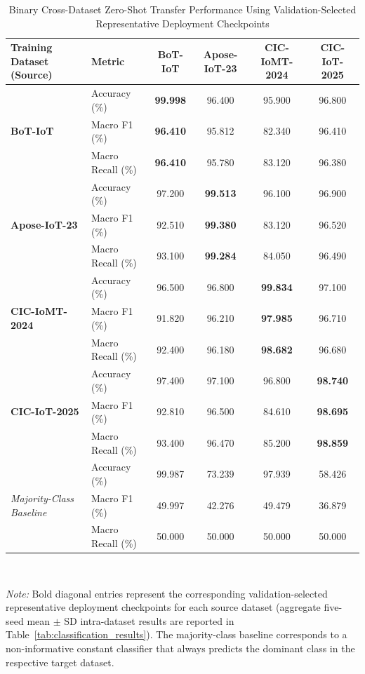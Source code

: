 \documentclass[a4paper,fleqn]{cas-sc}
\begin{document}
\begin{table}[h]
\centering
\caption{Binary Cross-Dataset Zero-Shot Transfer Performance Using Validation-Selected Representative Deployment Checkpoints}
\label{tab:cross_dataset}
\begin{tabular}{llcccc}
\toprule
\textbf{Training Dataset (Source)} & \textbf{Metric} & \textbf{BoT-IoT} & \textbf{Apose-IoT-23} & \textbf{CIC-IoMT-2024} & \textbf{CIC-IoT-2025} \\
\midrule
\multirow{3}{*}{\textbf{BoT-IoT}} & Accuracy (\%) & \textbf{99.998} & 96.400 & 95.900 & 96.800 \\
 & Macro F1 (\%) & \textbf{96.410} & 95.812 & 82.340 & 96.410 \\
 & Macro Recall (\%) & \textbf{96.410} & 95.780 & 83.120 & 96.380 \\
\cline{1-6}
\multirow{3}{*}{\textbf{Apose-IoT-23}} & Accuracy (\%) & 97.200 & \textbf{99.513} & 96.100 & 96.900 \\
 & Macro F1 (\%) & 92.510 & \textbf{99.380} & 83.120 & 96.520 \\
 & Macro Recall (\%) & 93.100 & \textbf{99.284} & 84.050 & 96.490 \\
\cline{1-6}
\multirow{3}{*}{\textbf{CIC-IoMT-2024}} & Accuracy (\%) & 96.500 & 96.800 & \textbf{99.834} & 97.100 \\
 & Macro F1 (\%) & 91.820 & 96.210 & \textbf{97.985} & 96.710 \\
 & Macro Recall (\%) & 92.400 & 96.180 & \textbf{98.682} & 96.680 \\
\cline{1-6}
\multirow{3}{*}{\textbf{CIC-IoT-2025}} & Accuracy (\%) & 97.400 & 97.100 & 96.800 & \textbf{98.740} \\
 & Macro F1 (\%) & 92.810 & 96.500 & 84.610 & \textbf{98.695} \\
 & Macro Recall (\%) & 93.400 & 96.470 & 85.200 & \textbf{98.859} \\
\midrule
\multirow{3}{*}{\textit{Majority-Class Baseline}} & Accuracy (\%) & 99.987 & 73.239 & 97.939 & 58.426 \\
 & Macro F1 (\%) & 49.997 & 42.276 & 49.479 & 36.879 \\
 & Macro Recall (\%) & 50.000 & 50.000 & 50.000 & 50.000 \\
\bottomrule
\end{tabular}
\\[1.5ex]
\parbox{\linewidth}{\footnotesize \textit{Note:} Bold diagonal entries represent the corresponding validation-selected representative deployment checkpoints for each source dataset (aggregate five-seed mean $\pm$ SD intra-dataset results are reported in Table~\ref{tab:classification_results}). The majority-class baseline corresponds to a non-informative constant classifier that always predicts the dominant class in the respective target dataset.}
\end{table}
\end{document}
